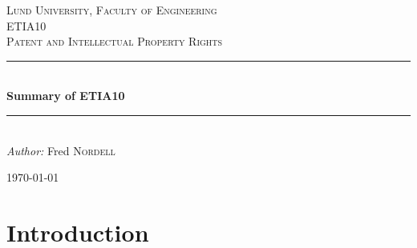 \documentclass[12pt]{article} %
\begin{document}

\begin{titlepage}

\newcommand{\HRule}{\rule{\linewidth}{0.5mm}} %

\center %

\textsc{\LARGE Lund University, Faculty of Engineering}\\[1.5cm] %
\textsc{\Large ETIA10}\\[0.5cm] %
\textsc{\large Patent and Intellectual Property Rights}\\[0.5cm] %

\HRule \\[1cm]
{ \huge \bfseries Summary of ETIA10}\\[0.4cm] %
\HRule \\[1.5cm]

\emph{Author:} Fred \textsc{Nordell} %

{\large \today}\\[3cm] %


\vfill %

\end{titlepage}


\tableofcontents %
\lstlistoflistings %
\listoffigures %
\listoftables %

\newpage %


\section{Introduction} %
\end{document}

